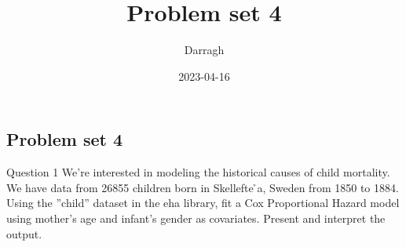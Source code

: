 \documentclass[
]{article}
\title{Problem set 4}
\author{Darragh}
\date{2023-04-16}
\begin{document}
\maketitle

\hypertarget{problem-set-4}{%
\subsection{Problem set 4}\label{problem-set-4}}

Question 1 We're interested in modeling the historical causes of child
mortality. We have data from 26855 children born in Skellefte ̊a, Sweden
from 1850 to 1884. Using the ''child'' dataset in the eha library, fit a
Cox Proportional Hazard model using mother's age and infant's gender as
covariates. Present and interpret the output.
\end{document}
